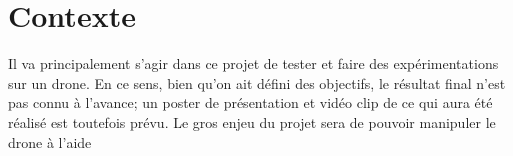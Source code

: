 \chapter{Contexte}
Il va principalement s'agir dans ce projet de tester et faire des expérimentations sur un drone. En ce sens, bien qu'on ait défini des objectifs, le résultat final n'est pas connu à l'avance; un poster de présentation et vidéo clip de ce qui aura été réalisé est toutefois prévu. Le gros enjeu du projet sera de pouvoir manipuler le drone à l'aide